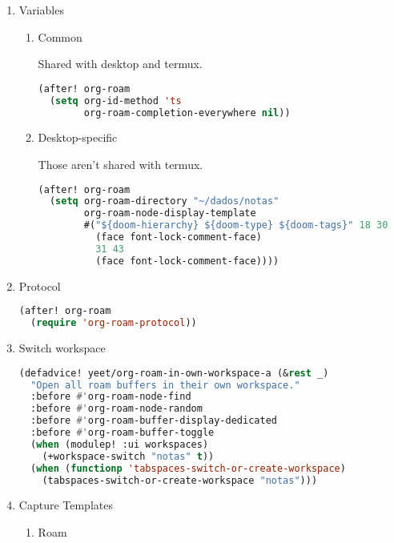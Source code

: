 \documentclass[11pt]{article}
\begin{document}
\begin{enumerate}
  \item Variables
  \label{sec:variables-2}

  
\begin{enumerate}
  \item Common
  \label{sec:common}

  Shared with desktop and termux.

\begin{lstlisting}[language=Lisp]
(after! org-roam
  (setq org-id-method 'ts
        org-roam-completion-everywhere nil))
\end{lstlisting}
  \item Desktop-specific
  \label{sec:desktop-specific}

  Those aren’t shared with termux.

\begin{lstlisting}[language=Lisp]
(after! org-roam
  (setq org-roam-directory "~/dados/notas"
        org-roam-node-display-template
        #("${doom-hierarchy} ${doom-type} ${doom-tags}" 18 30
          (face font-lock-comment-face)
          31 43
          (face font-lock-comment-face))))
\end{lstlisting}
\end{enumerate}

  \item Protocol
  \label{sec:protocol}

  \begin{lstlisting}[language=Lisp]
(after! org-roam
  (require 'org-roam-protocol))
\end{lstlisting}
  \item Switch workspace
  \label{sec:switch-workspace}

  \begin{lstlisting}[language=Lisp]
(defadvice! yeet/org-roam-in-own-workspace-a (&rest _)
  "Open all roam buffers in their own workspace."
  :before #'org-roam-node-find
  :before #'org-roam-node-random
  :before #'org-roam-buffer-display-dedicated
  :before #'org-roam-buffer-toggle
  (when (modulep! :ui workspaces)
    (+workspace-switch "notas" t))
  (when (functionp 'tabspaces-switch-or-create-workspace)
    (tabspaces-switch-or-create-workspace "notas")))
\end{lstlisting}
  \item Capture Templates
  \label{sec:capture-templates}

  
\begin{enumerate}
  \item Roam
  \label{sec:roam}


\end{enumerate}
\end{enumerate}
\end{document}
